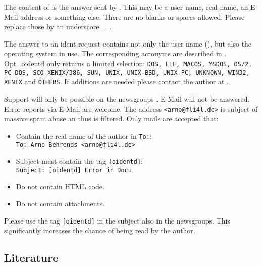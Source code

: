 \begin{description}

  The content of  is the answer sent by .
  This may be a user name, real name, an \mbox{E-Mail} address
  or something else. There are no blanks or spaces allowed. Please
  replace those by an underscore \_ .


  The answer to an ident request contains not only the user name (),
  but also the operating system in use. The corresponding acronyms are described in
  . Opt\_oidentd only returns a limited
  selection: \texttt{DOS, ELF, MACOS, MSDOS, OS/2, PC-DOS,
  SCO-XENIX/386, SUN, UNIX, UNIX-BSD, UNIX-PC, UNKNOWN, WIN32, XENIX} and
  \texttt{OTHERS}. If additions are needed please contact the author at
  .


\end{description}

Support will only be possible on the newsgroups .
\mbox{E-Mail} will not be answered. Error reports via \mbox{E-Mail} are welcome.
The address \texttt{<arno@fli4l.de>} is subject of massive spam abuse an thus is
filtered. Only mails are accepted that:
\begin{itemize}
 \item Contain the real name of the author in \texttt{To:}: \\
       \texttt{To: Arno Behrends <arno@fli4l.de>}
 \item Subject must contain the tag \texttt{[oidentd]}: \\
       \texttt{Subject: [oidentd] Error in Docu}
 \item Do not contain HTML code.
 \item Do not contain attachments.
\end{itemize}
Please use the tag \texttt{[oidentd]} in the subject also in the newsgroups. This
significantly increases the chance of being read by the author.


\subsection{Literature}

